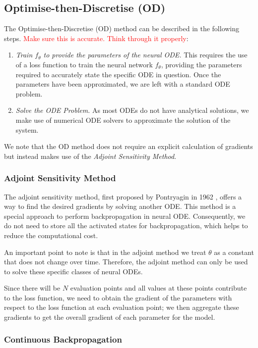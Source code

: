 \documentclass[a4paper,11pt,titlepage]{article}
\theoremstyle{definition}
\theoremstyle{plain}
\theoremstyle{remark}
\begin{document}
\subsection{Optimise-then-Discretise (OD)}
\label{sec:od}

The Optimise-then-Discretise (OD) method can be described in the following steps. \textcolor{red}{Make sure this is accurate. Think through it properly}:
\begin{enumerate}
    \item \textit{Train $f_\theta$ to provide the parameters of the neural ODE.} This requires the use of a loss function to train the neural network $f_\theta$, providing the parameters required to accurately state the specific ODE in question. Once the parameters have been approximated, we are left with a standard ODE problem.
    \item \textit{Solve the ODE Problem.} As most ODEs do not have analytical solutions, we make use of numerical ODE solvers to approximate the solution of the system.
\end{enumerate}

We note that the OD method does not require an explicit calculation of gradients but instead makes use of the \textit{Adjoint Sensitivity Method}.

\subsubsection{Adjoint Sensitivity Method}

The adjoint sensitivity method, first proposed by Pontryagin in 1962 \cite{pontryagin2018mathematical}, offers a way to find the desired gradients by solving another ODE. This method is a special approach to perform backpropagation in neural ODE. Consequently, we do not need to store all the activated states for backpropagation, which helps to reduce the computational cost. 

An important point to note is that in the adjoint method we treat $\theta$ as a constant that does not change over time. Therefore, the adjoint method can only be used to solve these specific classes of neural ODEs.

Since there will be $N$ evaluation points and all values at these points contribute to the loss function, we need to obtain the gradient of the parameters with respect to the loss function at each evaluation point; we then aggregate these gradients to get the overall gradient of each parameter for the model.
\subsubsection{Continuous Backpropagation}
\label{sec:contback}
\end{document}
